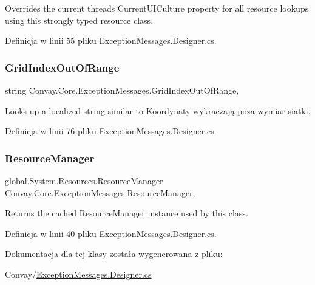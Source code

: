 Overrides the current thread\textquotesingle{}s Current\+U\+I\+Culture property for all resource lookups using this strongly typed resource class. 



Definicja w linii 55 pliku Exception\+Messages.\+Designer.\+cs.

\hypertarget{class_convay_1_1_core_1_1_exception_messages_a7976222cccaf7c82b987520268df483b}{}\label{class_convay_1_1_core_1_1_exception_messages_a7976222cccaf7c82b987520268df483b} 
\subsubsection{\texorpdfstring{Grid\+Index\+Out\+Of\+Range}{GridIndexOutOfRange}}
{\footnotesize\ttfamily string Convay.\+Core.\+Exception\+Messages.\+Grid\+Index\+Out\+Of\+Range\hspace{0.3cm}{\ttfamily [static]}, {\ttfamily [get]}}



Looks up a localized string similar to Koordynaty wykraczają poza wymiar siatki. 



Definicja w linii 76 pliku Exception\+Messages.\+Designer.\+cs.

\hypertarget{class_convay_1_1_core_1_1_exception_messages_afc60552a8b1edb41d0d4453e65d26c38}{}\label{class_convay_1_1_core_1_1_exception_messages_afc60552a8b1edb41d0d4453e65d26c38} 
\subsubsection{\texorpdfstring{Resource\+Manager}{ResourceManager}}
{\footnotesize\ttfamily global.\+System.\+Resources.\+Resource\+Manager Convay.\+Core.\+Exception\+Messages.\+Resource\+Manager\hspace{0.3cm}{\ttfamily [static]}, {\ttfamily [get]}}



Returns the cached Resource\+Manager instance used by this class. 



Definicja w linii 40 pliku Exception\+Messages.\+Designer.\+cs.



Dokumentacja dla tej klasy została wygenerowana z pliku\+:\begin{DoxyCompactItemize}
\item 
Convay/\hyperlink{_exception_messages_8_designer_8cs}{Exception\+Messages.\+Designer.\+cs}\end{DoxyCompactItemize}
